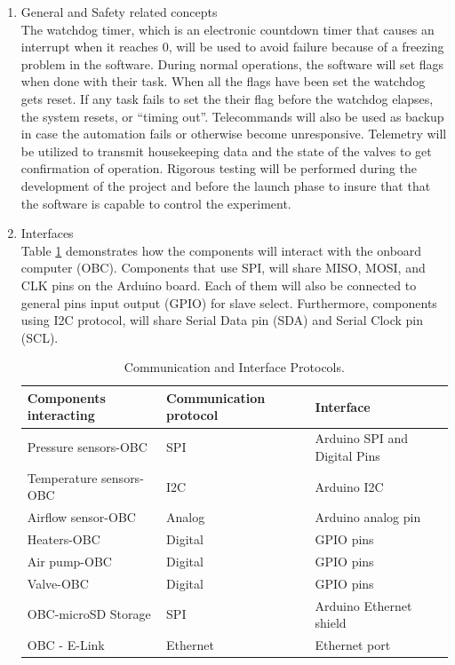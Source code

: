 \documentclass[a4paper,12pt,twoside]{article}
\begin{document}
\begin{enumerate}[label=(\alph*)]
\item{General and Safety related concepts}\\
The watchdog timer, which is an electronic countdown timer that causes an interrupt when it reaches 0, will be used to avoid failure because of a freezing problem in the software. During normal operations, the software will set flags when done with their task. When all the flags have been set the watchdog gets reset. If any task fails to set the their flag before the watchdog elapses, the system resets, or \enquote{timing out}. Telecommands will also be used as backup in case the automation fails or otherwise become unresponsive. Telemetry will be utilized to transmit housekeeping data and the state of the valves to get confirmation of operation. Rigorous testing will be performed during the development of the project and before the launch phase to insure that that the software is capable to control the experiment.
\item{Interfaces}\\
Table \ref{tab:comIntpro} demonstrates how the components will interact with the onboard computer (OBC). Components that use SPI, will share MISO, MOSI, and CLK pins on the Arduino board. Each of them will also be connected to general pins input output (GPIO) for slave select. Furthermore, components using I2C protocol, will share Serial Data pin (SDA) and Serial Clock pin (SCL).

\begin{table}[H]
\centering
\begin{tabular}{lll}
\textbf{Components interacting} & \textbf{Communication protocol} & \textbf{Interface}                 \\ \hline
Pressure sensors-OBC   & SPI                    & Arduino SPI and Digital Pins \\
Temperature sensors-OBC        & I2C                    & Arduino I2C \\
Airflow sensor-OBC     & Analog                    & Arduino analog pin \\
Heaters-OBC            & Digital                & GPIO pins \\
Air pump-OBC           & Digital                & GPIO pins \\
Valve-OBC              & Digital                & GPIO pins                 \\
OBC-microSD Storage    & SPI                    & Arduino Ethernet shield   \\
OBC - E-Link           & Ethernet               & Ethernet port            
\end{tabular}%
\caption{Communication and Interface Protocols.}
\label{tab:comIntpro}
\end{table}


\end{enumerate}
\end{document}
